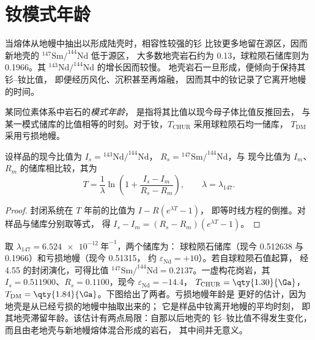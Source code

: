 \section{钕模式年龄}\label{sec:b3:advanced-geochronology:model-age}

当熔体从地幔中抽出以形成陆壳时，相容性较强的钐
比钕更多地留在源区，因而新地壳的
$^{147}\mathrm{Sm}/^{144}\mathrm{Nd}$ 低于源区，
大多数地壳岩石约为 0.13，球粒陨石储库则为 0.1966。其
$^{143}\mathrm{Nd}/^{144}\mathrm{Nd}$ 的增长因而较慢。
地壳岩石一旦形成，便倾向于保持其钐–钕比值，
即便经历风化、沉积甚至再熔融，
因而其中的钕记录了它离开地幔的时间。

\begin{definition}[模式年龄]\label{def:b3:advanced-geochronology:model-age}
某同位素体系中岩石的\emph{模式年龄}，
是指将其比值以现今母子体比值反推回去，
与某一模式储库的比值相等的时刻。对于钕，$T_{\mathrm{CHUR}}$
采用球粒陨石均一储库，
$T_{\mathrm{DM}}$ 采用亏损地幔。
\end{definition}

\begin{theorem}[模式年龄]\label{thm:b3:advanced-geochronology:model-age}
设样品的现今比值为 $I_s = {}^{143}\mathrm{Nd}/^{144}\mathrm{Nd}$，
$R_s = {}^{147}\mathrm{Sm}/^{144}\mathrm{Nd}$，与
现今比值为 $I_m$、$R_m$ 的储库相比较，其为
\[
T = \frac1\lambda\ln\left(1 + \frac{I_s - I_m}{R_s - R_m}\right),
\qquad \lambda = \lambda_{147}.
\]
\end{theorem}

\begin{proof}
封闭系统在 $T$ 年前的比值为 $I - R(e^{\lambda T} - 1)$，
即等时线方程的倒推。对样品与储库分别取等式，
得 $I_s - I_m = (R_s - R_m)(e^{\lambda T} - 1)$。
\end{proof}

取 $\lambda_{147} = \qty{6.524e-12}{\text{年}^{-1}}$，两个储库为：
球粒陨石储库（现今 0.512638 与 0.1966）和亏损地幔（现今 0.51315，
约 $\varepsilon_{\mathrm{Nd}} = +10$）。若自球粒陨石值起算，
经 \qty{4.55}{\Ga} 的封闭演化，可得比值
$^{147}\mathrm{Sm}/^{144}\mathrm{Nd} = 0.2137$。一虚构花岗岩，其
$I_s = 0.511900$、$R_s = 0.1100$，现今 $\varepsilon_{\mathrm{Nd}} = -14.4$，
$T_{\mathrm{CHUR}} = \qty{1.30}{\Ga}$，$T_{\mathrm{DM}} =
\qty{1.84}{\Ga}$。下图给出了两者。亏损地幔年龄是
更好的估计，因为地壳是从已经亏损的地幔中抽取出来的；
它是样品中钕离开地幔的平均时刻，
即其地壳滞留年龄。该估计有两点局限：自那以后地壳的
钐–钕比值不得发生变化，而且由老地壳与新地幔熔体混合形成的岩石，
其中间并无意义。

